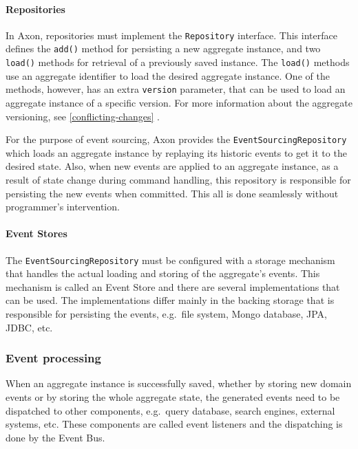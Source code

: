 \documentclass{book}
\begin{document}
\paragraph{Repositories}\label{repositories}

In Axon, repositories must implement the \texttt{Repository} interface.
This interface defines the \texttt{add()} method for persisting a new
aggregate instance, and two \texttt{load()} methods for retrieval of a
previously saved instance. The \texttt{load()} methods use an aggregate
identifier to load the desired aggregate instance. One of the methods,
however, has an extra \texttt{version} parameter, that can be used to
load an aggregate instance of a specific version. For more information
about the aggregate versioning, see \ref{conflicting-changes}
.

For the purpose of event sourcing, Axon provides the
\texttt{EventSourcingRepository} which loads an aggregate instance by
replaying its historic events to get it to the desired state. Also, when
new events are applied to an aggregate instance, as a result of state
change during command handling, this repository is responsible for
persisting the new events when committed. This all is done seamlessly
without programmer's intervention.

\paragraph{Event Stores}\label{event-stores}

The \texttt{EventSourcingRepository} must be configured with a storage
mechanism that handles the actual loading and storing of the aggregate's
events. This mechanism is called an Event Store and there are several
implementations that can be used. The implementations differ mainly in
the backing storage that is responsible for persisting the events,
e.g.~file system, Mongo database, JPA, JDBC, etc.


\subsubsection{Event processing}\label{event-processing}

When an aggregate instance is successfully saved, whether by storing new
domain events or by storing the whole aggregate state, the generated
events need to be dispatched to other components, e.g.~query database,
search engines, external systems, etc. These components are called event
listeners and the dispatching is done by the Event Bus.
\end{document}
